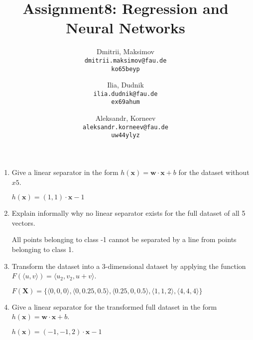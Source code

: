 \documentclass{homework}
\title{Assignment8: Regression and Neural Networks}
\author{
  Dmitrii, Maksimov\\
  \texttt{dmitrii.maksimov@fau.de} \\
  \texttt{ko65beyp}
  \and
  Ilia, Dudnik\\
  \texttt{ilia.dudnik@fau.de}\\
  \texttt{ex69ahum}
  \and
  Aleksandr, Korneev\\
  \texttt{aleksandr.korneev@fau.de}\\
  \texttt{uw44ylyz}
}
\begin{document}
\maketitle


\begin{enumerate}
	\item Give a linear separator in the form $h(\textbf{x}) = \textbf{w}\cdot \textbf{x}+b$ for the dataset without $x5$.
	
	$h(\textbf{x}) = (1, 1)\cdot \textbf{x} - 1$
	\item Explain informally why no linear separator exists for the full dataset of all 5 vectors.

	All points belonging to class -1 cannot be separated by a line from points belonging to class 1.

	\item Transform the dataset into a 3-dimensional dataset by applying the function $F(\langle u, v\rangle) = \langle u_2, v_2, u + v\rangle$.

	$F(\textbf{X}) = \{\langle 0,0,0 \rangle,\langle 0,0.25,0.5 \rangle,\langle 0.25,0,0.5 \rangle,\langle 1,1,2 \rangle,\langle 4,4,4 \rangle\}$

	\item Give a linear separator for the transformed full dataset in the form $h(\textbf{x}) = \textbf{w}\cdot \textbf{x}+b$.

	$h(\textbf{x}) = (-1, -1, 2)\cdot \textbf{x} - 1$
\end{enumerate}
\end{document}
